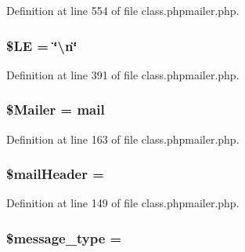 Definition at line 554 of file class.\+phpmailer.\+php.

\subsubsection[{\texorpdfstring{\$\+LE}{$LE}}]{\setlength{\rightskip}{0pt plus 5cm}\$LE = \char`\"{}\textbackslash{}n\char`\"{}}\hypertarget{class_p_h_p_mailer_a5ed269759d4ddf4fdf658930d93f69f7}{}\label{class_p_h_p_mailer_a5ed269759d4ddf4fdf658930d93f69f7}


Definition at line 391 of file class.\+phpmailer.\+php.

\subsubsection[{\texorpdfstring{\$\+Mailer}{$Mailer}}]{\setlength{\rightskip}{0pt plus 5cm}\$Mailer = \textquotesingle{}mail\textquotesingle{}}\hypertarget{class_p_h_p_mailer_a7792543896c9a827d4bfd3e29d2e0b01}{}\label{class_p_h_p_mailer_a7792543896c9a827d4bfd3e29d2e0b01}


Definition at line 163 of file class.\+phpmailer.\+php.

\subsubsection[{\texorpdfstring{\$mail\+Header}{$mailHeader}}]{\setlength{\rightskip}{0pt plus 5cm}\$mail\+Header = \textquotesingle{}\textquotesingle{}\hspace{0.3cm}{\ttfamily [protected]}}\hypertarget{class_p_h_p_mailer_a3ad70a9d71fa41fd488f3148f24a2b42}{}\label{class_p_h_p_mailer_a3ad70a9d71fa41fd488f3148f24a2b42}


Definition at line 149 of file class.\+phpmailer.\+php.

\subsubsection[{\texorpdfstring{\$message\+\_\+type}{$message_type}}]{\setlength{\rightskip}{0pt plus 5cm}\$message\+\_\+type = \textquotesingle{}\textquotesingle{}\hspace{0.3cm}{\ttfamily [protected]}}\hypertarget{class_p_h_p_mailer_a538e1d253d02a1664a29a632e549b070}{}\label{class_p_h_p_mailer_a538e1d253d02a1664a29a632e549b070}


